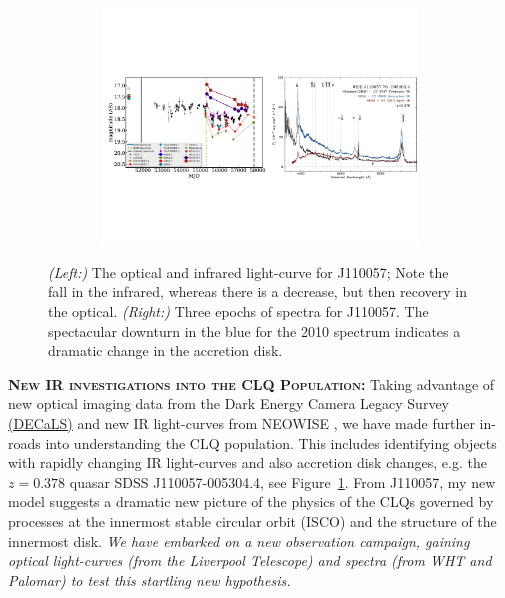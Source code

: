 \begin{figure}[h]
  \begin{center}
    \hspace{-0.5cm}
    \includegraphics[height=6.25cm,width=17.2cm]
    {figures/J110057_LC_Spectra_20171024.pdf}
    \vspace{-10pt}
    \caption{%
      \footnotesize 
      {\it (Left:)} The optical and infrared light-curve for J110057; 
      Note the fall in the infrared, whereas there is a decrease, but 
      then recovery in the optical. 
      {\it (Right:)} 
      Three epochs of spectra for J110057. 
      The spectacular downturn in the blue for the 2010 spectrum 
      indicates a dramatic change in the accretion disk.
    }
  \vspace{-16pt}
 \label{fig:J110057}
\end{center}
\end{figure}

\smallskip
\smallskip
\noindent
\textbf{\textsc{New IR investigations into the CLQ Population:}}
Taking advantage of new optical imaging data from the Dark Energy
Camera Legacy Survey \href{http://legacysurvey.org/decamls/}{(DECaLS)}
and new IR light-curves from NEOWISE \citep{Meisner2017a, Meisner2017b}, we have made further
in-roads into understanding the CLQ population. This includes
identifying objects with rapidly changing IR light-curves and also
accretion disk changes, e.g. the $z=0.378$ quasar SDSS
J110057-005304.4, see Figure~\ref{fig:J110057}. From J110057, my new
model \citep{Ross2018} suggests a dramatic new picture of the physics of the
CLQs governed by processes at the innermost stable circular orbit
(ISCO) and the structure of the innermost disk. {\it We have embarked
on a new observation campaign, gaining optical light-curves (from the
Liverpool Telescope) and spectra (from WHT and Palomar) to test this
startling new hypothesis.}

